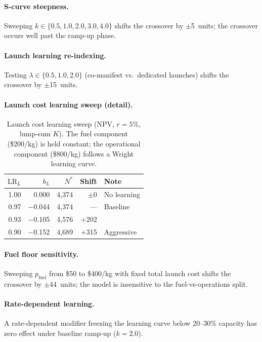 \documentclass[preprint,12pt]{elsarticle}
\begin{document}
\paragraph{S-curve steepness.} Sweeping $k \in \{0.5, 1.0, 2.0, 3.0, 4.0\}$ shifts the crossover by $\pm$5~units; the crossover occurs well past the ramp-up phase.

\paragraph{Launch learning re-indexing.} Testing $\lambda \in \{0.5, 1.0, 2.0\}$ (co-manifest vs.\ dedicated launches) shifts the crossover by $\pm$15~units.

\paragraph{Launch cost learning sweep (detail).}

\begin{table}[htbp]
\centering
\caption{Launch cost learning sweep (NPV, $r = 5\%$, lump-sum $K$). The fuel component (\$200/kg) is held constant; the operational component (\$800/kg) follows a Wright learning curve.}
\label{tab:launch_learning}
\small
\begin{tabular}{@{}rrrrl@{}}
\toprule
$\mathrm{LR}_L$ & $b_L$ & $N^*$ & Shift & Note \\
\midrule
1.00 & 0.000  & 4{,}374 & $\pm$0 & No learning \\
0.97 & $-$0.044 & 4{,}374 & ---    & Baseline \\
0.93 & $-$0.105 & 4{,}576 & $+$202 & \\
0.90 & $-$0.152 & 4{,}689 & $+$315 & Aggressive \\
\bottomrule
\end{tabular}
\end{table}

\paragraph{Fuel floor sensitivity.} Sweeping $p_{\mathrm{fuel}}$ from \$50 to \$400/kg with fixed total launch cost shifts the crossover by $\pm$44~units; the model is insensitive to the fuel-vs-operations split.

\paragraph{Rate-dependent learning.} A rate-dependent modifier freezing the learning curve below 20--30\% capacity has zero effect under baseline ramp-up ($k = 2.0$).
\end{document}
